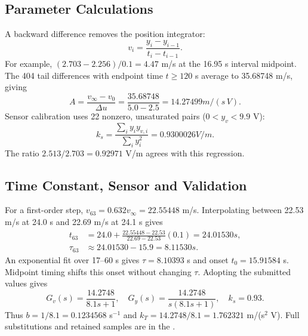 \subsection{Parameter Calculations}
A backward difference removes the position integrator:
\begin{equation}\label{eq:diff}
v_i=\frac{y_i-y_{i-1}}{t_i-t_{i-1}}.
\end{equation}
For example, $(2.703-2.256)/0.1=4.47$ m/s at the 16.95 s interval midpoint. The 404 tail differences with endpoint time $t\ge120$ s average to 35.68748 m/s, giving
\begin{equation}\label{eq:gainid}
A=\frac{v_\infty-v_0}{\Delta u}=\frac{35.68748}{5.0-2.5}=14.27499\unit{m/(s\,V)}.
\end{equation}
Sensor calibration uses 22 nonzero, unsaturated pairs ($0<y_v<9.9$ V):
\begin{equation}\label{eq:sensor}
k_s=\frac{\sum_i y_i y_{v,i}}{\sum_i y_i^2}=0.9300026\unit{V/m}.
\end{equation}
The ratio $2.513/2.703=0.92971$ V/m agrees with this regression.
\page

\subsection{Time Constant, Sensor and Validation}
For a first-order step, $v_{63}=0.632v_\infty=22.55448$ m/s. Interpolating between 22.53 m/s at 24.0 s and 22.69 m/s at 24.1 s gives
\begin{align}
t_{63}&=24.0+\frac{22.55448-22.53}{22.69-22.53}(0.1)=24.01530\unit{s},\\
\tau_{63}&\approx24.01530-15.9=8.11530\unit{s}.
\end{align}
An exponential fit over 17--60 s gives $\tau=8.10393$ s and onset $t_0=15.91584$ s. Midpoint timing shifts this onset without changing $\tau$.
Adopting the submitted values gives
\begin{equation}\label{eq:identified}
G_v(s)=\frac{14.2748}{8.1s+1},\quad G_y(s)=\frac{14.2748}{s(8.1s+1)},\quad k_s=0.93.
\end{equation}
Thus $b=1/8.1=0.1234568$ s$^{-1}$ and $k_T=14.2748/8.1=1.762321$ m/(s$^2$ V). Full substitutions and retained samples are in the .
